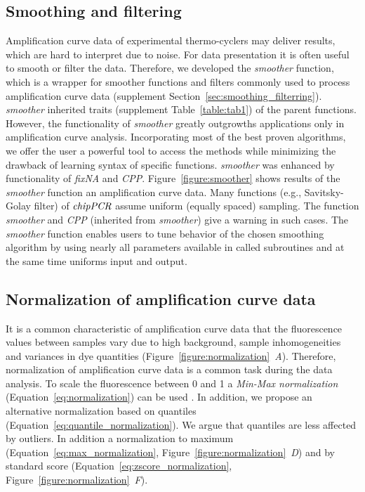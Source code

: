 \documentclass[twocolumn]{bmcart}%
\begin{document}
\subsection*{Smoothing and filtering}

Amplification curve data of experimental thermo-cyclers may deliver results, 
which are hard to interpret due to noise. For data presentation it is often 
useful to smooth or filter the data. Therefore, we developed the 
\textsl{smoother} function, which is a wrapper for smoother functions and 
filters commonly used to process amplification curve data (supplement 
Section~\ref{sec:smoothing_filterring}). \textsl{smoother} inherited traits 
(supplement Table~\ref{table:tab1})  of the parent functions. However, the 
functionality of \textsl{smoother} greatly outgrowths applications only in 
amplification curve analysis. Incorporating most of the best proven algorithms, 
we offer the user a powerful tool to access the methods while minimizing the 
drawback of learning syntax of specific functions. \textsl{smoother} was 
enhanced by functionality of \textsl{fixNA} and \textsl{CPP}. 
Figure~\ref{figure:smoother} shows results of the \textsl{smoother} function an 
amplification curve data. Many functions (e.g., Savitsky-Golay filter) of 
$\emph{chipPCR}$ assume uniform (equally spaced) sampling. The function 
\textsl{smoother} and \textsl{CPP} (inherited from \textsl{smoother}) give a 
warning in such cases. The \textsl{smoother} function enables users to tune 
behavior of the chosen smoothing algorithm by using nearly all parameters 
available in called subroutines and at the same time uniforms input and output.

\subsection*{Normalization of amplification curve data}

It is a common characteristic of amplification curve data that the fluorescence 
values between samples vary due to high background, sample inhomogeneities and 
variances in dye quantities (Figure~\ref{figure:normalization}~\emph{A}). 
Therefore, normalization of amplification curve data is a common task during the 
data analysis. To scale the fluorescence between 0 and 1 a \emph{Min-Max 
normalization} (Equation~\ref{eq:normalization}) can be used 
\cite{roediger_RJ_2013}. In addition, we propose an alternative normalization based on 
quantiles (Equation~\ref{eq:quantile_normalization}). We argue that quantiles are less 
affected by outliers. In addition a normalization to maximum 
(Equation~\ref{eq:max_normalization}, 
Figure~\ref{figure:normalization}~\emph{D}) and by standard score 
(Equation~\ref{eq:zscore_normalization}, 
Figure~\ref{figure:normalization}~\emph{F}).
\end{document}
